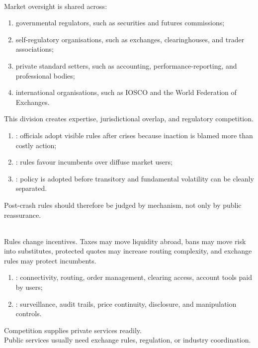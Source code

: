 \documentclass[a4paper,oneside,openany]{book}
\begin{document}
\begin{taxonomy} \\
Market oversight is shared across:
\begin{enumerate}[label=\roman*.]
\setlength{\itemsep}{0pt}
\item governmental regulators, such as securities and futures commissions;
\item self-regulatory organisations, such as exchanges, clearinghouses, and trader associations;
\item private standard setters, such as accounting, performance-reporting, and professional bodies;
\item international organisations, such as IOSCO and the World Federation of Exchanges.
\end{enumerate}
This division creates expertise, jurisdictional overlap, and regulatory competition.
\end{taxonomy}

\begin{taxonomy} 
\begin{enumerate}[label=\roman*.]
\setlength{\itemsep}{0pt}
\item {}: officials adopt visible rules after crises because inaction is blamed more than costly action;
\item {}: rules favour incumbents over diffuse market users;
\item {}: policy is adopted before transitory and fundamental volatility can be cleanly separated.
\end{enumerate}
Post-crash rules should therefore be judged by mechanism, not only by public reassurance.
\end{taxonomy}

\begin{caveat} \\
Rules change incentives. Taxes may move liquidity abroad, bans may move risk into substitutes, protected quotes may increase routing complexity, and exchange rules may protect incumbents.
\end{caveat}

\begin{taxonomy} 
\begin{enumerate}[label=\roman*.]
\setlength{\itemsep}{0pt}
\item {}: connectivity, routing, order management, clearing access, account tools paid by users;
\item {}: surveillance, audit trails, price continuity, disclosure, and manipulation controls.
\end{enumerate}
Competition supplies private services readily.\\
Public services usually need exchange rules, regulation, or industry coordination.
\end{taxonomy}
\end{document}
